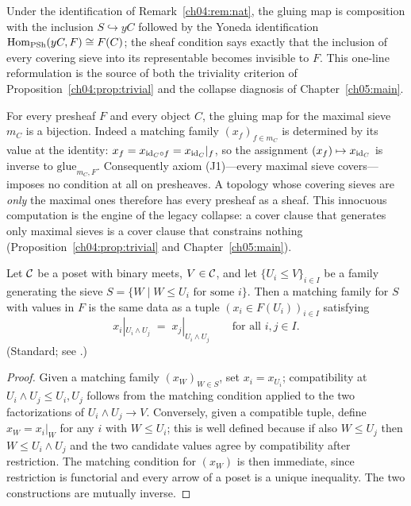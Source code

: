 Under the identification of Remark~\ref{ch04:rem:nat}, the gluing map is
composition with the inclusion $S\hookrightarrow yC$ followed by the Yoneda
identification $\mathrm{Hom}_{\mathrm{PSh}}(yC,F)\cong F(C)$; the sheaf condition says exactly
that the inclusion of every covering sieve into its representable becomes
invisible to $F$. This one-line reformulation is the
source of both the triviality criterion of
Proposition~\ref{ch04:prop:trivial} and the collapse diagnosis of
Chapter~\ref{ch05:main}.

\begin{example}\label{ch04:ex:maximal}
For every presheaf $F$ and every object $C$, the gluing map for the maximal
sieve $m_C$ is a bijection. Indeed a matching family $(x_f)_{f\in m_C}$ is
determined by its value at the identity: $x_f=x_{\mathrm{id}_C\circ f}=x_{\mathrm{id}_C}|_f$,
so the assignment $(x_f)\mapsto x_{\mathrm{id}_C}$ is inverse to
$\mathrm{glue}_{m_C,F}$. Consequently axiom (J1)---every maximal sieve
covers---imposes no condition at all on presheaves. A topology whose covering
sieves are \emph{only} the maximal ones therefore has every presheaf as a
sheaf. This innocuous computation is the engine of the legacy collapse: a
cover clause that generates only maximal sieves is a cover clause that
constrains nothing (Proposition~\ref{ch04:prop:trivial} and
Chapter~\ref{ch05:main}).
\end{example}

\begin{lemma}\label{ch04:lem:meets}
Let $\mathcal{C}$ be a poset with binary meets, $V\in\mathcal{C}$, and let
$\{U_i\le V\}_{i\in I}$ be a family generating the sieve
$S=\{W \mid W\le U_i \text{ for some } i\}$. Then a matching family for $S$
with values in $F$ is the same data as a tuple $(x_i\in F(U_i))_{i\in I}$
satisfying
\[
x_i|_{U_i\wedge U_j} \;=\; x_j|_{U_i\wedge U_j}\qquad\text{for all } i,j\in I.
\]
(Standard; see \cite[Chap.~III]{maclane}.)
\end{lemma}

\begin{proof}
Given a matching family $(x_W)_{W\in S}$, set $x_i=x_{U_i}$; compatibility at
$U_i\wedge U_j\le U_i,U_j$ follows from the matching condition applied to the
two factorizations of $U_i\wedge U_j\to V$. Conversely, given a compatible
tuple, define $x_W=x_i|_W$ for any $i$ with $W\le U_i$; this is well defined
because if also $W\le U_j$ then $W\le U_i\wedge U_j$ and the two candidate
values agree by compatibility after restriction. The matching condition for
$(x_W)$ is then immediate, since restriction is functorial and every arrow of a
poset is a unique inequality. The two constructions are mutually inverse.
\end{proof}


